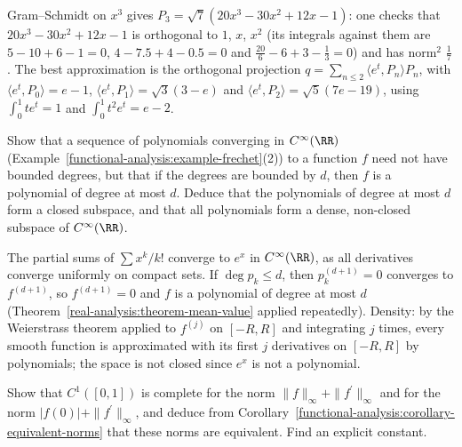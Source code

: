 \begin{solution}
Gram--Schmidt on $x^3$ gives $P_3 = \sqrt7(20x^3 - 30x^2 + 12x - 1)$: one checks that $20x^3 - 30x^2 + 12x - 1$ is orthogonal to $1$, $x$, $x^2$ (its integrals against them are $5 - 10 + 6 - 1 = 0$,
$4 - 7.5 + 4 - 0.5 = 0$ and $\frac{20}{6} - 6 + 3 - \frac13 = 0$) and has norm$^2$ $\frac17$. The best approximation is the orthogonal projection $q = \sum_{n \leq 2}\langle e^t, P_n\rangle P_n$, with
$\langle e^t, P_0\rangle = e - 1$, $\langle e^t, P_1\rangle = \sqrt3(3 - e)$ and $\langle e^t, P_2\rangle = \sqrt5(7e - 19)$, using $\int_0^1te^t = 1$ and $\int_0^1t^2e^t = e - 2$.
\end{solution}

\begin{exercise}\label{functional-analysis:exercise-frechet-polynomials}
Show that a sequence of polynomials converging in $C^\infty(\RR)$ (Example~\ref{functional-analysis:example-frechet}(2)) to a function $f$ need not have bounded degrees, but that if the degrees are bounded
by $d$, then $f$ is a polynomial of degree at most $d$. Deduce that the polynomials of degree at most $d$ form a closed subspace, and that all polynomials form a dense, non-closed subspace of $C^\infty(\RR)$.
\end{exercise}

\begin{solution}
The partial sums of $\sum x^k/k!$ converge to $e^x$ in $C^\infty(\RR)$, as all derivatives converge uniformly on compact sets. If $\deg p_k \leq d$, then $p_k^{(d+1)} = 0$ converges to $f^{(d+1)}$, so
$f^{(d+1)} = 0$ and $f$ is a polynomial of degree at most $d$ (Theorem~\ref{real-analysis:theorem-mean-value} applied repeatedly). Density: by the Weierstrass theorem applied to $f^{(j)}$ on $[-R, R]$ and
integrating $j$ times, every smooth function is approximated with its first $j$ derivatives on $[-R, R]$ by polynomials; the space is not closed since $e^x$ is not a polynomial.
\end{solution}

\begin{exercise}\label{functional-analysis:exercise-equivalent-norms}
Show that $C^1([0, 1])$ is complete for the norm $\|f\|_\infty + \|f^{\prime}\|_\infty$ and for the norm $|f(0)| + \|f^{\prime}\|_\infty$, and deduce from Corollary~\ref{functional-analysis:corollary-equivalent-norms} that these
norms are equivalent. Find an explicit constant.
\end{exercise}

